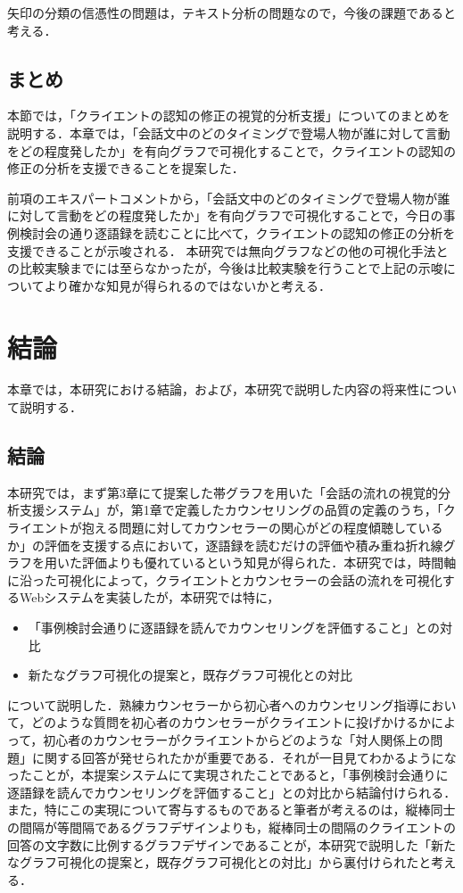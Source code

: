 \documentclass[shuuron]{kuee}
\begin{document}
矢印の分類の信憑性の問題は，テキスト分析の問題なので，今後の課題であると考える．


\section{まとめ}%
本節では，「クライエントの認知の修正の視覚的分析支援」についてのまとめを説明する．本章では，「会話文中のどのタイミングで登場人物が誰に対して言動をどの程度発したか」を有向グラフで可視化することで，クライエントの認知の修正の分析を支援できることを提案した．

前項のエキスパートコメントから，「会話文中のどのタイミングで登場人物が誰に対して言動をどの程度発したか」を有向グラフで可視化することで，今日の事例検討会の通り逐語録を読むことに比べて，クライエントの認知の修正の分析を支援できることが示唆される．
本研究では無向グラフなどの他の可視化手法との比較実験までには至らなかったが，今後は比較実験を行うことで上記の示唆についてより確かな知見が得られるのではないかと考える．


\chapter{結論}%

本章では，本研究における結論，および，本研究で説明した内容の将来性について説明する．

\section{結論}

本研究では，まず第3章にて提案した帯グラフを用いた「会話の流れの視覚的分析支援システム」が，第1章で定義したカウンセリングの品質の定義のうち，「クライエントが抱える問題に対してカウンセラーの関心がどの程度傾聴しているか」の評価を支援する点において，逐語録を読むだけの評価や積み重ね折れ線グラフを用いた評価よりも優れているという知見が得られた．本研究では，時間軸に沿った可視化によって，クライエントとカウンセラーの会話の流れを可視化するWebシステムを実装したが，本研究では特に，
\begin{itemize}
  \item 「事例検討会通りに逐語録を読んでカウンセリングを評価すること」との対比

  \item 新たなグラフ可視化の提案と，既存グラフ可視化との対比
\end{itemize}
について説明した．熟練カウンセラーから初心者へのカウンセリング指導において，どのような質問を初心者のカウンセラーがクライエントに投げかけるかによって，初心者のカウンセラーがクライエントからどのような「対人関係上の問題」に関する回答が発せられたかが重要である．それが一目見てわかるようになったことが，本提案システムにて実現されたことであると，「事例検討会通りに逐語録を読んでカウンセリングを評価すること」との対比から結論付けられる．また，特にこの実現について寄与するものであると筆者が考えるのは，縦棒同士の間隔が等間隔であるグラフデザインよりも，縦棒同士の間隔のクライエントの回答の文字数に比例するグラフデザインであることが，本研究で説明した「新たなグラフ可視化の提案と，既存グラフ可視化との対比」から裏付けられたと考える．
\end{document}
